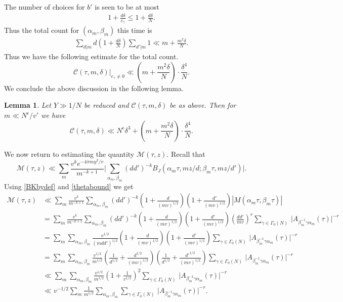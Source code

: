 \documentclass[11pt]{amsart}
\numberwithin{equation}{section}
\theoremstyle{plain}
\newtheorem{lem}[thm]{Lemma}
\theoremstyle{definition}
\newcommand{\mc}{\mathcal}
\newcommand{\n}{\nonumber}
\begin{document}
The number of choices for $b'$ is seen to be at most
\begin{align}
    1+ \frac{d \delta}{c_\gamma} \le 1+ \frac{d \delta}{N}.
\end{align}
Thus the total count for $(\alpha_m, \beta_m)$ this time is
\begin{align}
     \sum_{d|m} d (1+ \frac{d \delta}{N}) \sum_{d'|m} 1 \ll m + \frac{m^2 \delta}{N}.
\end{align}
Thus we have the following estimate for the total count.
\begin{equation}
    \mc C(\tau, m, \delta)|_{c_\gamma\neq 0}\ll \left(m + \frac{m^2 \delta}{N}\right) \cdot \frac{\delta^4}{N}.
\end{equation}
We conclude the above discussion in the following lemma.
\begin{lem}\label{lem:count}
    Let $Y\gg 1/N$ be reduced and $\mc C(\tau, m, \delta)$ be as above. Then for $m\ll N^\epsilon/v'$ we have
    \begin{equation}
        \mc C(\tau, m, \delta)\ll N^\epsilon \delta^3 + \left(m + \frac{m^2 \delta}{N}\right) \cdot \frac{\delta^4}{N}.
    \end{equation}
\end{lem}
We now return to estimating the quantity $\mc M(\tau, z)$. Recall that
\begin{equation}
\mc M(\tau, z) \ll \sum_m \frac{v^{k}e^{-4\pi my^2/v}}{m^{-k+1}}\big|\sum_{\alpha_m, \beta_m} (dd')^{-k} B_J(\alpha_m\tau, mz/d;\beta_m\tau, mz/d')\big|.
\end{equation}
Using \eqref{BKbydef} and \eqref{thetabound} we get
\begin{align}
    \mc M(\tau, z)&\ll \sum_m \frac{v^{k}}{m^{-k+1}}\sum_{\alpha_m,\beta_m }(dd')^{-k} \left(1+\frac{d}{(mv)^{1/2}}\right)\left(1+\frac{d'}{(mv)^{1/2}}\right) \left| M(\alpha_m\tau,\beta_m\tau)\right| \n \\
    & = \sum_m \frac{v^{k}}{m^{-k+1}}\sum_{\alpha_m, \beta_m}(dd')^{-k} \left(1+\frac{d}{(mv)^{1/2}}\right)\left(1+\frac{d'}{(mv)^{1/2}}\right)\left(\frac{dd'}{mv}\right)^{r} \sum_{ \gamma\in \Gamma_0(N)} \, \big |A_{\beta_m^{-1} \gamma \alpha_m}(\tau)|^{-r} \n \\
    &= \sum_m \sum_{\alpha_m, \beta_m} \frac{v^{1/2}}{(mdd')^{1/2}}\left(1+\frac{d}{(mv)^{1/2}}\right)\left(1+\frac{d'}{(mv)^{1/2}}\right)\sum_{ \gamma\in \Gamma_0(N)} \, \big |A_{\beta_m^{-1} \gamma \alpha_m}(\tau)|^{-r}\n \\
    &= \sum_m \sum_{\alpha_m, \beta_m} \frac{v^{1/2}}{m^{1/2}}\left(\frac{1}{d^{1/2}}+\frac{d^{1/2}}{(mv)^{1/2}}\right)\left(\frac{1}{d^{1/2}}+\frac{d'^{1/2}}{(mv)^{1/2}}\right)\sum_{ \gamma\in \Gamma_0(N)} \, \big |A_{\beta_m^{-1} \gamma \alpha_m}(\tau)|^{-r} \n \\
    &\ll \sum_m \sum_{\alpha_m, \beta_m} \frac{v^{1/2}}{m^{1/2}}\left(1+\frac{1}{v^{1/2}}\right)^2\sum_{ \gamma\in \Gamma_0(N)} \, \big |A_{\beta_m^{-1} \gamma \alpha_m}(\tau)|^{-r} \n \\
    &\ll v^{-1/2} \sum_m  \frac{1}{m^{1/2}} \sum_{\alpha_m, \beta_m}\sum_{ \gamma\in \Gamma_0(N)} \, \big |A_{\beta_m^{-1} \gamma \alpha_m}(\tau)|^{-r}. \label{mtau-bd}
\end{align}
\end{document}
